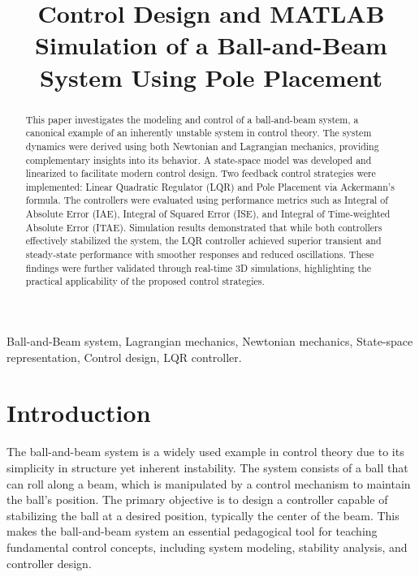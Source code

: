 \documentclass[conference]{IEEEtran}
\begin{document}
\title{Control Design and MATLAB Simulation of a Ball-and-Beam System Using Pole Placement}

\author{
}

\maketitle

\begin{abstract}
    This paper investigates the modeling and control of a ball-and-beam system, a canonical example of an inherently unstable system in control theory. The system dynamics were derived using both Newtonian and Lagrangian mechanics, providing complementary insights into its behavior. A state-space model was developed and linearized to facilitate modern control design. Two feedback control strategies were implemented: Linear Quadratic Regulator (LQR) and Pole Placement via Ackermann’s formula. The controllers were evaluated using performance metrics such as Integral of Absolute Error (IAE), Integral of Squared Error (ISE), and Integral of Time-weighted Absolute Error (ITAE). Simulation results demonstrated that while both controllers effectively stabilized the system, the LQR controller achieved superior transient and steady-state performance with smoother responses and reduced oscillations. These findings were further validated through real-time 3D simulations, highlighting the practical applicability of the proposed control strategies.
\end{abstract}


\begin{IEEEkeywords}
Ball-and-Beam system, Lagrangian mechanics, Newtonian mechanics, State-space representation, Control design, LQR controller.
\end{IEEEkeywords}

\section{Introduction}
\label{sec:intro}
The ball-and-beam system is a widely used example in control theory due to its simplicity in structure yet inherent instability. The system consists of a ball that can roll along a beam, which is manipulated by a control mechanism to maintain the ball's position. The primary objective is to design a controller capable of stabilizing the ball at a desired position, typically the center of the beam. This makes the ball-and-beam system an essential pedagogical tool for teaching fundamental control concepts, including system modeling, stability analysis, and controller design.
\end{document}
